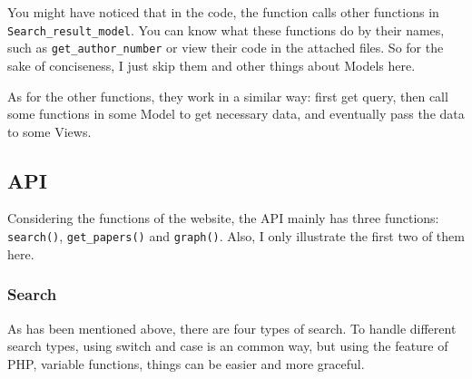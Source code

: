 \documentclass[a4paper]{article}
\begin{document}
You might have noticed that in the code, the function calls other functions in \texttt{Search_result_model}.
You can know what these functions do by their names, such as \texttt{get_author_number} or view their code
in the attached files. So for the sake of conciseness, I just skip them and other things about Models here.

As for the other functions, they work in a similar way: first get query, then call some functions in some Model
to get necessary data, and eventually pass the data to some Views.
        \subsection{API}
Considering the functions of the website, the API mainly has three functions: \texttt{search()}, 
\texttt{get_papers()} and \texttt{graph()}. Also, I only illustrate the first two of them here.
            \subsubsection{Search}
As has been mentioned above, there are four types of search. To handle different search types, using switch and case
is an common way, but using the feature of PHP, variable functions, things can be easier and more graceful. 
\end{document}
